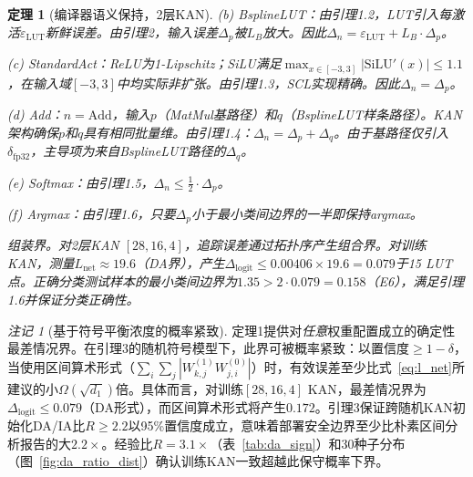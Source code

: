\documentclass[journal,onecolumn]{IEEEtran}
\theoremstyle{definition}
\theoremstyle{plain}
\newtheorem{theorem}{定理}
\theoremstyle{remark}
\newtheorem{remark}{注记}
\begin{document}
\begin{theorem}[编译器语义保持，2层KAN]
\noindent\textit{(b) BsplineLUT：}由引理1.2，LUT引入每激活$\varepsilon_{\text{LUT}}$新鲜误差。由引理2，输入误差$\Delta_p$被$L_B$放大。因此$\Delta_n = \varepsilon_{\text{LUT}} + L_B \cdot \Delta_p$。

\noindent\textit{(c) StandardAct：}ReLU为1-Lipschitz；SiLU满足$\max_{x\in[-3,3]}|\text{SiLU}'(x)| \leq 1.1$，在输入域$[-3,3]$中均实际非扩张。由引理1.3，SCL实现精确。因此$\Delta_n = \Delta_p$。

\noindent\textit{(d) Add：}$n = \text{Add}$，输入$p$（MatMul基路径）和$q$（BsplineLUT样条路径）。KAN架构确保$p$和$q$具有相同批量维。由引理1.4：$\Delta_n = \Delta_p + \Delta_q$。由于基路径仅引入$\delta_{\text{fp32}}$，主导项为来自BsplineLUT路径的$\Delta_q$。

\noindent\textit{(e) Softmax：}由引理1.5，$\Delta_n \leq \frac{1}{2} \cdot \Delta_p$。

\noindent\textit{(f) Argmax：}由引理1.6，只要$\Delta_p$小于最小类间边界的一半即保持argmax。

\textit{组装界。}对2层KAN $[28,16,4]$，追踪误差通过拓扑序产生组合界。对训练KAN，测量$L_{\text{net}} \approx 19.6$（DA界），产生$\Delta_{\text{logit}} \leq 0.00406 \times 19.6 = 0.079$于15 LUT点。正确分类测试样本的最小类间边界为$1.35 > 2 \cdot 0.079 = 0.158$（E6），满足引理1.6并保证分类正确性。
\end{theorem}

\begin{remark}[基于符号平衡浓度的概率紧致]
\label{rem:prob_tightening}
定理1提供对\textit{任意}权重配置成立的确定性最差情况界。在引理3的随机符号模型下，此界可被概率紧致：以置信度$\geq 1-\delta$，当使用区间算术形式（$\sum_i \sum_j |W^{(1)}_{k,j}W^{(0)}_{j,i}|$）时，有效误差至少比式~\eqref{eq:l_net}所建议的小$\Omega(\sqrt{d_1})$倍。具体而言，对训练$[28,16,4]$ KAN，最差情况界为$\Delta_{\text{logit}} \leq 0.079$（DA形式），而区间算术形式将产生$0.172$。引理3保证跨随机KAN初始化DA/IA比$R \geq 2.2$以95\%置信度成立，意味着部署安全边界至少比朴素区间分析报告的大$2.2\times$。经验比$R = 3.1\times$（表~\ref{tab:da_sign}）和30种子分布（图~\ref{fig:da_ratio_dist}）确认训练KAN一致超越此保守概率下界。
\end{remark}
\end{document}
